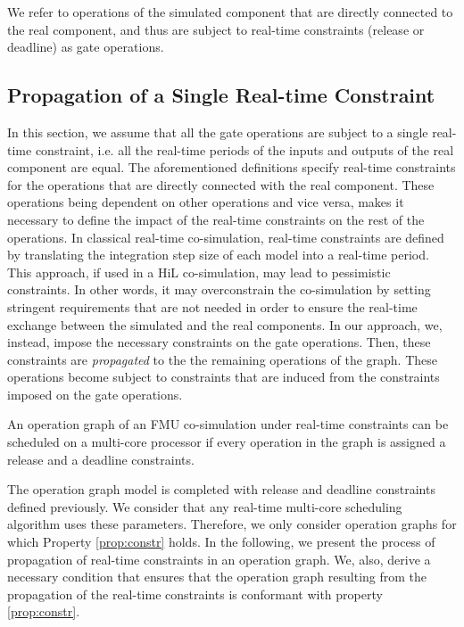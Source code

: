 We refer to operations of the simulated component that are directly connected to the real component, and thus are subject to real-time constraints (release or deadline) as gate operations. 

\subsection{Propagation of a Single Real-time Constraint}

In this section, we assume that all the gate operations are subject to a single real-time constraint, i.e. all the real-time periods of the inputs and outputs of the real component are equal.
The aforementioned definitions specify real-time constraints for the operations that are directly connected with the real component. These operations being dependent on other operations and vice versa, makes it necessary to define the impact of the real-time constraints on the rest of the operations. In classical real-time co-simulation, real-time constraints are defined by translating the integration step size of each model into a real-time period. This approach, if used in a HiL co-simulation, may lead to pessimistic constraints. In other words, it may overconstrain the co-simulation by setting stringent requirements that are not needed in order to ensure the real-time exchange between the simulated and the real components. In our approach, we, instead, impose the necessary constraints on the gate operations. Then, these constraints are \textit{propagated} to the the remaining operations of the graph. These operations become subject to constraints that are induced from the constraints imposed on the gate operations.

\begin{property}
An operation graph of an FMU co-simulation under real-time constraints can be scheduled on a multi-core processor if every operation in the graph is assigned a release and a deadline constraints.
\label{prop:constr}
\end{property}

The operation graph model is completed with release and deadline constraints defined previously. We consider that any real-time multi-core scheduling algorithm uses these parameters. Therefore, we only consider operation graphs for which Property \ref{prop:constr} holds. In the following, we present the process of propagation of real-time constraints in an operation graph. We, also, derive a necessary condition that ensures that the operation graph resulting from the propagation of the real-time constraints is conformant with property \ref{prop:constr}.

